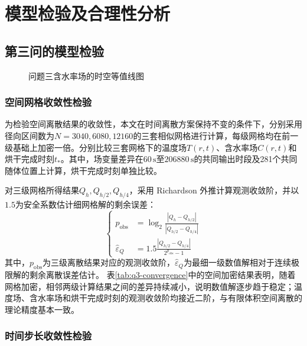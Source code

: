 \documentclass[withoutpreface,bwprint]{cumcmthesis}
\begin{document}
\section{模型检验及合理性分析}

\subsection{第三问的模型检验}

\begin{figure}[H]
\centering

\caption{问题三含水率场的时空等值线图}
\label{fig:q3-contours}
\end{figure}

\subsubsection{空间网格收敛性检验}

为检验空间离散结果的收敛性，本文在时间离散方案保持不变的条件下，分别采用径向区间数为$N=3040,6080,12160$的三套相似网格进行计算，每级网格均在前一级基础上加密一倍。分别比较三套网格下的温度场$T(r,t)$、含水率场$C(r,t)$和烘干完成时刻$t_*$。其中，场变量差异在$60\,\mathrm s$至$206880\,\mathrm s$的共同输出时段及281个共同随体位置上计算，烘干完成时刻单独比较。

对三级网格所得结果$Q_h,Q_{h/2},Q_{h/4}$，采用 Richardson 外推计算观测收敛阶，并以$1.5$为安全系数估计细网格解的剩余误差\cite{roache1998}：
\begin{equation}
\left\{
\begin{aligned}
p_{\mathrm{obs}}
&=\log_2\frac{|Q_h-Q_{h/2}|}{|Q_{h/2}-Q_{h/4}|}\\
\widehat\varepsilon_Q
&=1.5\frac{|Q_{h/2}-Q_{h/4}|}{2^{p_{\mathrm{obs}}}-1}
\end{aligned}
\right.
\label{eq:q3-richardson-estimate}
\end{equation}
其中，$p_{\mathrm{obs}}$为三级离散结果对应的观测收敛阶，$\widehat\varepsilon_Q$为最细一级数值解相对于连续极限解的剩余离散误差估计。
表\ref{tab:q3-convergence}中的空间加密结果表明，随着网格加密，相邻两级计算结果之间的差异持续减小，说明数值解逐步趋于稳定；温度场、含水率场和烘干完成时刻的观测收敛阶均接近二阶，与有限体积空间离散的理论精度基本一致。

\subsubsection{时间步长收敛性检验}
\end{document}
